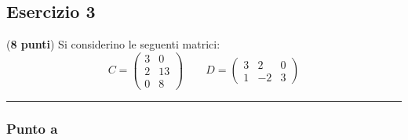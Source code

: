 \documentclass[a4paper]{article}
\newcommand{\longline}{\noindent\rule{\textwidth}{0.4pt}}
\begin{document}
	\subsection{Esercizio 3}
	
	(\textbf{8 punti}) Si considerino le seguenti matrici:
	\begin{equation*}
		C = \begin{pmatrix}
			3 & 0 \\ 2 & 13 \\ 0 & 8
		\end{pmatrix}
		\hspace{2em}
		D = \begin{pmatrix}
			3 & 2 & 0 \\ 1 & -2 & 3
		\end{pmatrix}
	\end{equation*}
	
	\longline
	
	\subsubsection{Punto a}
	
\end{document}
